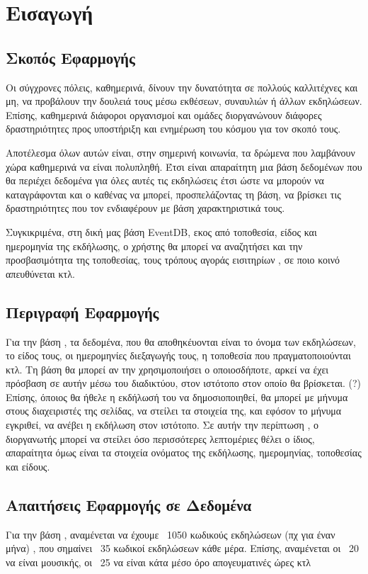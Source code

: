 \section{Εισαγωγή}

\subsection{Σκοπός Εφαρμογής}

\par Οι σύγχρονες πόλεις, καθημερινά, δίνουν την δυνατότητα σε πολλούς καλλιτέχνες και μη,
να προβάλουν την δουλειά τους μέσω εκθέσεων, συναυλιών ή άλλων εκδηλώσεων. Επίσης, καθημερινά διάφοροι οργανισμοί και ομάδες διοργανώνουν διάφορες δραστηριότητες προς υποστήριξη και ενημέρωση του κόσμου για τον σκοπό τους. 
\par Αποτέλεσμα όλων αυτών είναι, στην σημερινή κοινωνία, τα δρώμενα που λαμβάνουν χώρα καθημερινά να είναι πολυπληθή. Έτσι είναι απαραίτητη μια βάση δεδομένων που θα περιέχει δεδομένα για όλες αυτές τις εκδηλώσεις έτσι ώστε να μπορούν να καταγράφονται και ο καθένας να μπορεί, προσπελάζοντας τη βάση, να βρίσκει τις δραστηριότητες που τον ενδιαφέρουν με βάση χαρακτηριστικά τους.
\par Συγκικριμένα, στη δική μας βάση EventDB, εκος από τοποθεσία, είδος και ημερομηνία της εκδήλωσης, ο χρήστης θα μπορεί να αναζητήσει και την προσβασιμότητα της τοποθεσίας, τους τρόπους αγοράς εισιτηρίων , σε ποιο κοινό απευθύνεται κτλ. 

\subsection{Περιγραφή Εφαρμογής}

\par Για την βάση \titlos, τα δεδομένα, που θα αποθηκέυονται είναι το όνομα των εκδηλώσεων, το είδος τους,  οι ημερομηνίες διεξαγωγής τους, η τοποθεσία που πραγματοποιούνται κτλ. Τη βάση θα μπορεί αν την χρησιμοποιήσει ο οποιοσδήποτε, αρκεί να έχει πρόσβαση σε αυτήν μέσω του διαδικτύου, στον ιστότοπο στον οποίο θα βρίσκεται. (?) Επίσης, όποιος θα ήθελε η εκδήλωσή του να δημοσιοποιηθεί, θα μπορεί με μήνυμα στους διαχειριστές της σελίδας, να στείλει τα στοιχεία της, και εφόσον το μήνυμα εγκριθεί, να ανέβει η εκδήλωση στον ιστότοπο. Σε αυτήν την περίπτωση , ο διοργανωτής μπορεί να στείλει όσο περισσότερες λεπτομέριες θέλει ο ίδιος, απαραίτητα όμως είναι τα στοιχεία ονόματος της εκδήλωσης, ημερομηνίας, τοποθεσίας και είδους.

\subsection{Απαιτήσεις Εφαρμογής σε Δεδομένα}

\par Για την βάση \titlos, αναμένεται να έχουμε ~1050 κωδικούς εκδηλώσεων (πχ για έναν μήνα) , που σημαίνει ~35 κωδικοί εκδηλώσεων κάθε μέρα. Επίσης, αναμένεται οι ~20 να είναι μουσικής, οι ~25 να είναι κάτα μέσο όρο απογευματινές ώρες κτλ



